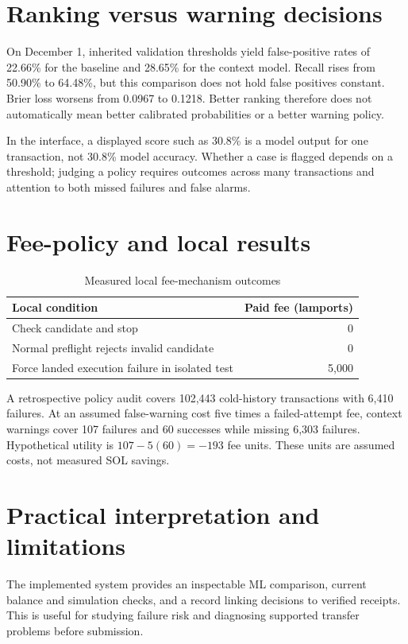 \documentclass[12pt,a4paper,oneside]{report}
\begin{document}
\section{Ranking versus warning decisions}
On December 1, inherited validation thresholds yield false-positive rates of 22.66\% for the baseline and 28.65\% for the context model. Recall rises from 50.90\% to 64.48\%, but this comparison does not hold false positives constant. Brier loss worsens from 0.0967 to 0.1218. Better ranking therefore does not automatically mean better calibrated probabilities or a better warning policy.

In the interface, a displayed score such as 30.8\% is a model output for one transaction, not 30.8\% model accuracy. Whether a case is flagged depends on a threshold; judging a policy requires outcomes across many transactions and attention to both missed failures and false alarms.
\section{Fee-policy and local results}
\begin{table}[ht]\centering\caption{Measured local fee-mechanism outcomes}
\begin{tabularx}{\textwidth}{Y r}\toprule Local condition&Paid fee (lamports)\\\midrule Check candidate and stop&0\\Normal preflight rejects invalid candidate&0\\Force landed execution failure in isolated test&5,000\\\bottomrule\end{tabularx}\end{table}
A retrospective policy audit covers 102,443 cold-history transactions with 6,410 failures. At an assumed false-warning cost five times a failed-attempt fee, context warnings cover 107 failures and 60 successes while missing 6,303 failures. Hypothetical utility is $107-5(60)=-193$ fee units. These units are assumed costs, not measured SOL savings.
\section{Practical interpretation and limitations}
The implemented system provides an inspectable ML comparison, current balance and simulation checks, and a record linking decisions to verified receipts. This is useful for studying failure risk and diagnosing supported transfer problems before submission.
\end{document}
